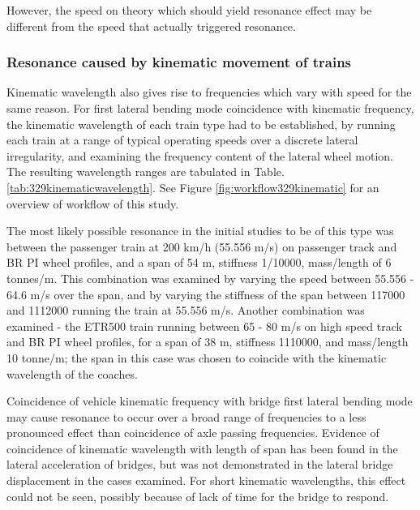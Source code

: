 However, the speed on theory which should yield resonance effect may be different from the speed that actually triggered resonance.

\subsubsection{Resonance caused by kinematic movement of trains} 
Kinematic wavelength also gives rise to frequencies which vary with speed for the same reason. For first lateral bending mode coincidence with kinematic frequency, the kinematic wavelength of each train type had to be established, by running each train at a range of typical operating speeds over a discrete lateral irregularity, and examining the frequency content of the lateral wheel motion. The resulting wavelength ranges are tabulated in Table.\ref{tab:329kinematicwavelength}. See Figure \ref{fig:workflow329kinematic} for an overview of workflow of this study.

The most likely possible resonance in the initial studies to be of this type was between the passenger train at 200 km/h (55.556 m/s) on passenger track and BR PI wheel profiles, and a span of 54 m, stiffness 1/10000, mass/length of 6 tonnes/m. This combination was examined by varying the speed between 55.556 - 64.6 m/s over the span, and by varying the stiffness of the span between 117000 and 1112000 running the train at 55.556 m/s. Another combination was examined - the ETR500 train running between 65 - 80 m/s on high speed track and BR PI wheel profiles, for a span of 38 m, stiffness 1110000, and mass/length 10 tonne/m; the span in this case was chosen to coincide with the kinematic wavelength of the coaches.

Coincidence of vehicle kinematic frequency with bridge first lateral bending mode may cause resonance to occur over a broad range of frequencies to a less pronounced effect than coincidence of axle passing frequencies. Evidence of coincidence of kinematic wavelength with length of span has been found in the lateral acceleration of bridges, but was not demonstrated in the lateral bridge displacement in the cases examined. For short kinematic wavelengths, this effect could not be seen, possibly because of lack of time for the bridge to respond.



